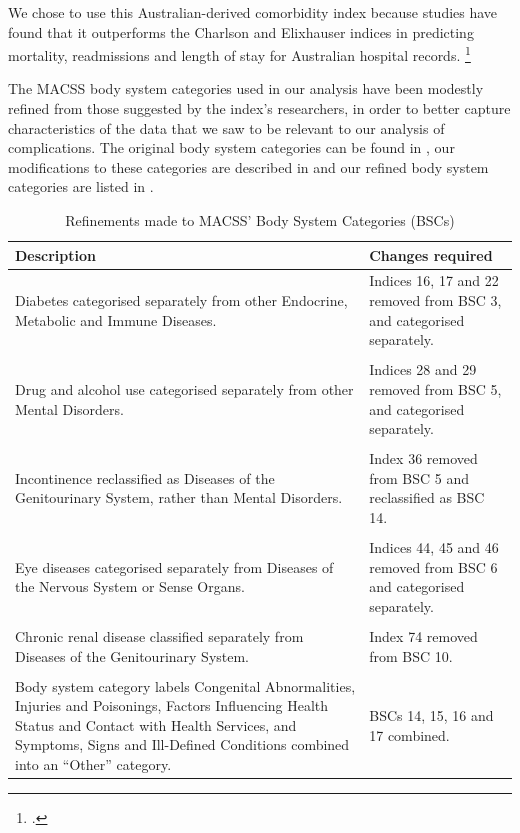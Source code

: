 \documentclass[submission]{grattan}
\begin{document}
We chose to use this Australian-derived comorbidity index because studies have found that it outperforms the Charlson and Elixhauser indices in predicting mortality, readmissions and length of stay for Australian hospital records.%
	\footcites{toson2016version}{holman2005multipurpose}

The MACSS body system categories used in our analysis have been modestly refined from those suggested by the index's researchers, in order to better capture characteristics of the data that we saw to be relevant to our analysis of complications.
The original body system categories can be found in \textcite{toson2016version}, our modifications to these categories are described in  and our refined body system categories are listed in .

\begin{table}
\caption{Refinements made to MACSS' Body System Categories (BSCs)}\label{tbl:Grattan-refinements-to-MACSS}
\begin{tabularx}{\linewidth}{XX}
\toprule
\textbf{Description} & \textbf{Changes required}\tabularnewline
\midrule
Diabetes categorised separately from other Endocrine, Metabolic and Immune Diseases. & Indices 16, 17 and 22 removed from BSC 3, and categorised separately.\tabularnewline
\phantom{.}\\[-5.5pt]
Drug and alcohol use categorised separately from other Mental Disorders. & Indices 28 and 29 removed from BSC 5, and categorised separately.\tabularnewline
\phantom{.}\\[-5.5pt]
Incontinence reclassified as Diseases of the Genitourinary System, rather than Mental Disorders. & Index 36 removed from BSC 5 and reclassified as BSC 14.\tabularnewline
\phantom{.}\\[-5.5pt]
Eye diseases categorised separately from Diseases of the Nervous System or Sense Organs. & Indices 44, 45 and 46 removed from BSC 6 and categorised separately.\tabularnewline
\phantom{.}\\[-5.5pt]
Chronic renal disease classified separately from Diseases of the Genitourinary System. & Index 74 removed from BSC 10.\tabularnewline
\phantom{.}\\[-5.5pt]
Body system category labels Congenital Abnormalities, Injuries and Poisonings, Factors Influencing Health Status and Contact with Health Services, and Symptoms, Signs and Ill-Defined Conditions combined into an ``Other'' category. & BSCs 14, 15, 16 and 17 combined.\tabularnewline
\bottomrule
\end{tabularx}
\end{table}
\end{document}
